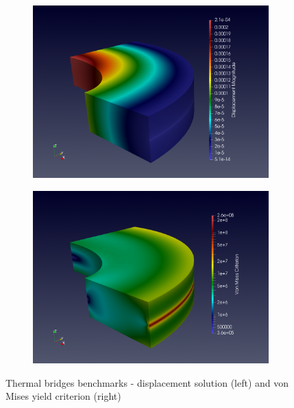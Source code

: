 \begin{figure}[h]
  \centering
  \begin{subfigure}[c]{0.49\textwidth}
    \centering
    \includegraphics[width=\textwidth]{graphics/feelpp/feelpp-benchmark-nafems-le10-solution-disp.png}
  \end{subfigure}
  \hfill
  \begin{subfigure}[c]{0.49\textwidth}
    \centering
    \includegraphics[width=\textwidth]{graphics/feelpp/feelpp-benchmark-nafems-le10-solution-vonmises.png}
  \end{subfigure}
  \caption{Thermal bridges benchmarks - displacement solution (left) and
    von Mises yield criterion (right)}
  \label{fig:wp1:feelpp:nafems-le10:visualization}
\end{figure}

